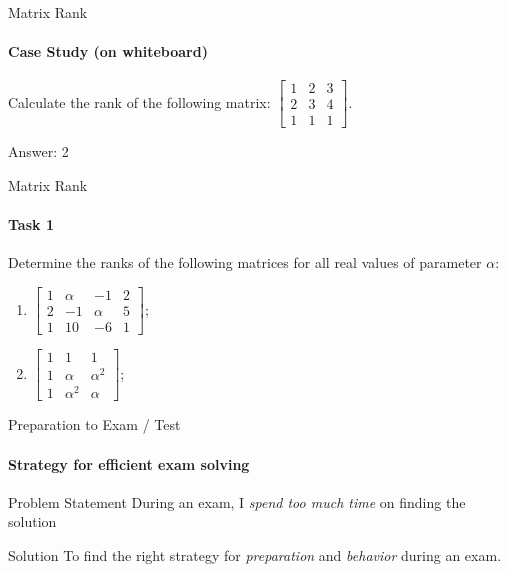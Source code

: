 \documentclass[aspectratio=169,notes]{beamer}
\begin{document}
\begin{frame}[t]{Matrix Rank}
\framesubtitle{Case Study (on whiteboard)}
Calculate the rank of the following matrix: $\begin{bmatrix}1&2&3\\2&3&4\\1&1&1\end{bmatrix}$. \medskip

\alert{\Large Answer: 2}
\end{frame}

\begin{frame}[t]{Matrix Rank}
\framesubtitle{Task 1}
Determine the ranks of the following matrices for all real values of parameter $\alpha$:
\begin{enumerate}

    \item $\begin{bmatrix}1&\alpha&-1&2\\2&-1&\alpha&5\\1&10&-6&1\end{bmatrix}$;
    \item $\begin{bmatrix}1&1&1\\1&\alpha&\alpha^2\\1&\alpha^2&\alpha\end{bmatrix}$;
\end{enumerate}
\end{frame}

\begin{frame}[t]{Preparation to Exam / Test}
\framesubtitle{Strategy for efficient exam solving}
\begin{exampleblock}{Problem Statement}
    During an exam, I \textit{spend too much time} on finding the solution
\end{exampleblock}
\begin{alertblock}{Solution}
    To find the right strategy for \textit{preparation} and \textit{behavior} during an exam.
\end{alertblock}
\end{frame}
\end{document}
